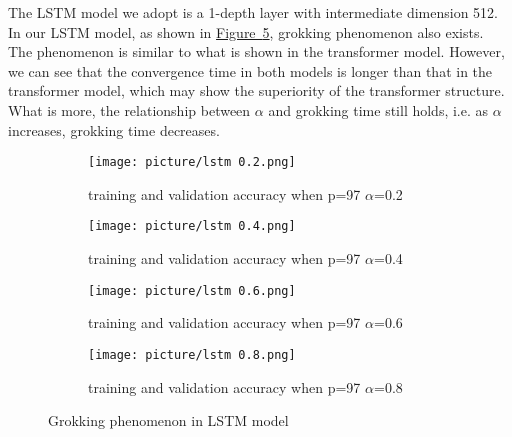 \documentclass{article}
\begin{document}
\vspace{-0.5em}

The LSTM model we adopt is a 1-depth layer with intermediate dimension 512. In our LSTM model, as shown in \hyperref[fig4:main] {Figure~\ref{fig4:main}}, grokking phenomenon also exists. The phenomenon is similar to what is shown in the transformer model. However, we can see that the convergence time in both models is longer than that in the transformer model, which may show the superiority of the transformer structure. What is more, the relationship between $\alpha$ and grokking time still holds, i.e. as $\alpha$ increases, grokking time decreases.


\begin{figure}[htbp]
  \centering
   \begin{subfigure}[b]{0.22\textwidth}
        \centering
    \texttt{[image: picture/lstm 0.2.png]}
    \caption{training and validation accuracy when p=97 $\alpha$=0.2}
    \label{fig4:sub1}
  \end{subfigure}
  \hspace{0.5em} %
     \begin{subfigure}[b]{0.22\textwidth}
        \centering
    \texttt{[image: picture/lstm 0.4.png]}
    \caption{training and validation accuracy when p=97 $\alpha$=0.4}
    \label{fig4:sub2}
  \end{subfigure}
  \hspace{0.5em} %
     \begin{subfigure}[b]{0.22\textwidth}
        \centering
    \texttt{[image: picture/lstm 0.6.png]}
    \caption{training and validation accuracy when p=97 $\alpha$=0.6}
    \label{fig4:sub3}
  \end{subfigure}
  \hspace{0.5em} %
    \begin{subfigure}[b]{0.22\textwidth}
        \centering
    \texttt{[image: picture/lstm 0.8.png]}
    \caption{training and validation accuracy when p=97 $\alpha$=0.8}
    \label{fig4:sub4}
  \end{subfigure}
  
  \renewcommand{\figurename}{Figure}
  \caption{Grokking phenomenon in LSTM model}
  \label{fig4:main}
\end{figure}

\vspace{-2em}
\end{document}
